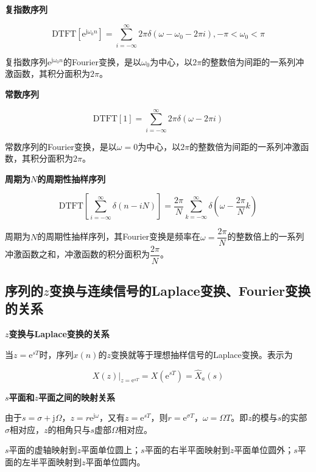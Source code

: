 \documentclass[cn, hazy, blue, normal, 12pt]{elegantnote}
\begin{document}
\textbf{复指数序列}

\begin{equation}
    \text{DTFT}[\text{e}^{\text{j}\omega_0 n}]=\sum_{i=-\infty}^{\infty}{2\pi\delta(\omega-\omega_0-2\pi i)}, -\pi<\omega_0<\pi
\end{equation}

复指数序列$\text{e}^{\text{j}\omega_0 n}$的Fourier变换，是以$\omega_0$为中心，以$2\pi$的整数倍为间距的一系列冲激函数，其积分面积为$2\pi$。

\textbf{常数序列}

\begin{equation}
    \text{DTFT}[1]=\sum_{i=-\infty}^{\infty}{2\pi\delta(\omega-2\pi i)}
\end{equation}

常数序列的Fourier变换，是以$\omega=0$为中心，以$2\pi$的整数倍为间距的一系列冲激函数，其积分面积为$2\pi$。

\textbf{周期为$N$的周期性抽样序列}

\begin{equation}
    \text{DTFT}\left[\sum_{i=-\infty}^{\infty}{\delta(n-iN)}\right]=\frac{2\pi}{N}\sum_{k=-\infty}^{\infty}{\delta\left(\omega-\frac{2\pi}{N}k\right)}
\end{equation}

周期为$N$的周期性抽样序列，其Fourier变换是频率在$\omega=\dfrac{2\pi}{N}$的整数倍上的一系列冲激函数之和，冲激函数的积分面积为$\dfrac{2\pi}{N}$。

\subsection{序列的$z$变换与连续信号的Laplace变换、Fourier变换的关系}

\textbf{$z$变换与Laplace变换的关系}

当$z=\text{e}^{sT}$时，序列$x(n)$的$z$变换就等于理想抽样信号的Laplace变换。表示为

\begin{equation}
        \left.X(z)\right|_{z=\text{e}^{sT}}=X\left(\text{e}^{sT}\right)=\hat{X}_a (s)
\end{equation}

\textbf{$s$平面和$z$平面之间的映射关系}

由于$s=\sigma+\text{j}\Omega$，$z=r\text{e}^{\text{j}\omega}$，又有$z=\text{e}^{sT}$，则$r=\text{e}^{\sigma T}$，$\omega=\Omega T$。即$z$的模与$s$的实部$\sigma$相对应，$z$的相角只与$s$虚部$\Omega$相对应。

$s$平面的虚轴映射到$z$平面单位圆上；$s$平面的右半平面映射到$z$平面单位圆外；$s$平面的左半平面映射到$z$平面单位圆内。
\end{document}
